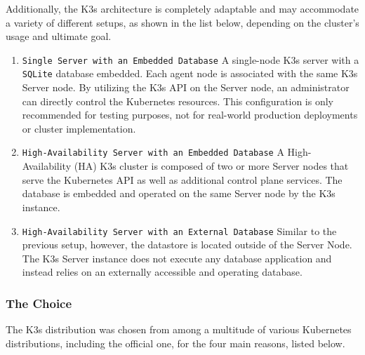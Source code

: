 Additionally, the K3s architecture is completely adaptable and may accommodate a
variety of different setups, as shown in the list below, depending on the cluster's
usage and ultimate goal.
\begin{enumerate}
  \item \texttt{Single Server with an Embedded Database}
    \newline
    A single-node K3s server with a \texttt{SQLite} database embedded. Each
    agent node is associated with the same K3s Server node. By utilizing the K3s
    API on the Server node, an administrator can directly control the Kubernetes
    resources.
    \newline
    This configuration is only recommended for testing purposes, not for real-world
    production deployments or cluster implementation.

  \item \texttt{High-Availability Server with an Embedded Database}
    \newline
    A High-Availability (HA) K3s cluster is composed of two or more Server nodes
    that serve the Kubernetes API as well as additional control plane services. The
    database is embedded and operated on the same Server node by the K3s instance.

  \item \texttt{High-Availability Server with an External Database}
    \newline
    Similar to the previous setup, however, the datastore is located outside of
    the Server Node. The K3s Server instance does not execute any database application
    and instead relies on an externally accessible and operating database.
\end{enumerate}

\subsubsection{The Choice}
\label{subsubsec:implementation_dependencies_k3s_the_choice}

The K3s distribution was chosen from among a multitude of various Kubernetes
distributions, including the official one, for the four main reasons, listed below.

